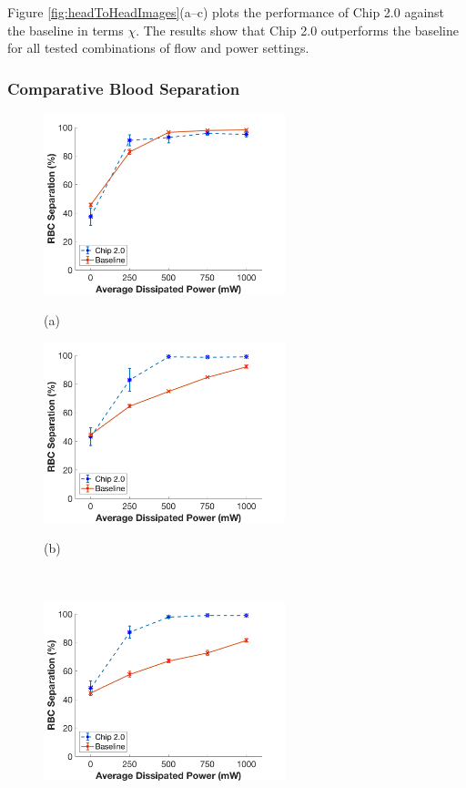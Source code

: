 Figure \ref{fig:headToHeadImages}(a--c) plots the performance of Chip 2.0 against the baseline in terms $\chi$. The results show that Chip 2.0 outperforms the baseline for all tested combinations of flow and power settings.
\subsubsection{Comparative Blood Separation}
\label{sssec:comparisonBlood}

\begin{figure}[H]
  \begin{minipage}[t]{0.49\linewidth}\centering
    \includegraphics[width=7cm]{ErrorBarBloodData25ul}
    \medskip
    \centerline{(a)}
  \end{minipage}\hfill
  \begin{minipage}[t]{0.49\linewidth}\centering
    \includegraphics[width=7cm]{ErrorBarBloodData50ul}
    \medskip
    \centerline{(b)}\\
  \end{minipage}
  \begin{minipage}[t]{0.99\linewidth}\centering
    \includegraphics[width=7cm]{ErrorBarBloodData75ul}

\end{minipage}
\end{figure}

